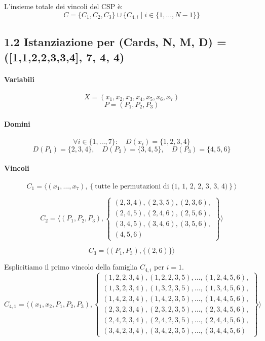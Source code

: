 \documentclass[a4paper,11pt]{article}
\begin{document}
L'insieme totale dei vincoli del CSP è:
\[
C = \{C_1, C_2, C_3\} \cup \{C_{4,i} \mid i \in \{1, \ldots, N-1\}\}
\]

\newpage

\subsection*{1.2 Istanziazione per (Cards, N, M, D) = ([1,1,2,2,3,3,4], 7, 4, 4)}

\paragraph{Variabili}
\[
X = (x_1, x_2, x_3, x_4, x_5, x_6, x_7)
\]
\[
P = (P_1, P_2, P_3)
\]

\paragraph{Domini}
\[
\forall i \in \{1, \ldots, 7\}:\quad D(x_i) = \{1, 2, 3, 4\}
\]
\[
D(P_1) = \{2, 3, 4\}, \quad D(P_2) = \{3, 4, 5\}, \quad D(P_3) = \{4, 5, 6\}
\]

\paragraph{Vincoli}

\[
C_1 = \langle (x_1, \ldots, x_7), \left\{
  \text{tutte le permutazioni di (1, 1, 2, 2, 3, 3, 4)}
\right\} \rangle
\]

\[
C_2 = \langle (P_1, P_2, P_3), \left\{ 
\begin{array}{l}
(2, 3, 4), (2, 3, 5), (2, 3, 6), \\
(2, 4, 5), (2, 4, 6), (2, 5, 6), \\
(3, 4, 5), (3, 4, 6), (3, 5, 6), \\
(4, 5, 6)
\end{array}
\right\} \rangle
\]

\[
C_3 = \langle (P_1, P_3), \{ (2, 6) \} \rangle
\]

Esplicitiamo il primo vincolo della famiglia $C_{4,i}$ per $i=1$. 
\[
C_{4,1} = \langle (x_1, x_2, P_1, P_2, P_3), \left\{ 
\begin{array}{l}
(1, 2, 2, 3, 4), (1, 2, 2, 3, 5), \dots, (1, 2, 4, 5, 6), \\
(1, 3, 2, 3, 4), (1, 3, 2, 3, 5), \dots, (1, 3, 4, 5, 6), \\
(1, 4, 2, 3, 4), (1, 4, 2, 3, 5), \dots, (1, 4, 4, 5, 6), \\
(2, 3, 2, 3, 4), (2, 3, 2, 3, 5), \dots, (2, 3, 4, 5, 6), \\
(2, 4, 2, 3, 4), (2, 4, 2, 3, 5), \dots, (2, 4, 4, 5, 6), \\
(3, 4, 2, 3, 4), (3, 4, 2, 3, 5), \dots, (3, 4, 4, 5, 6)
\end{array}
\right\} \rangle
\]
\newpage
\end{document}
